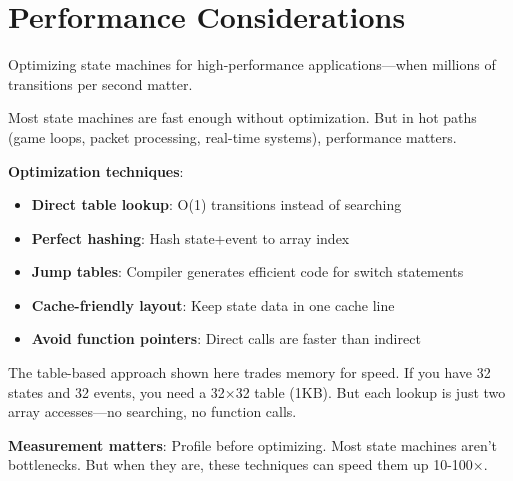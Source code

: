 \section{Performance Considerations}

Optimizing state machines for high-performance applications—when millions of transitions per second matter.

Most state machines are fast enough without optimization. But in hot paths (game loops, packet processing, real-time systems), performance matters.

\textbf{Optimization techniques}:
\begin{itemize}
    \item \textbf{Direct table lookup}: O(1) transitions instead of searching
    \item \textbf{Perfect hashing}: Hash state+event to array index
    \item \textbf{Jump tables}: Compiler generates efficient code for switch statements
    \item \textbf{Cache-friendly layout}: Keep state data in one cache line
    \item \textbf{Avoid function pointers}: Direct calls are faster than indirect
\end{itemize}

The table-based approach shown here trades memory for speed. If you have 32 states and 32 events, you need a 32×32 table (1KB). But each lookup is just two array accesses—no searching, no function calls.

\textbf{Measurement matters}: Profile before optimizing. Most state machines aren't bottlenecks. But when they are, these techniques can speed them up 10-100×.

